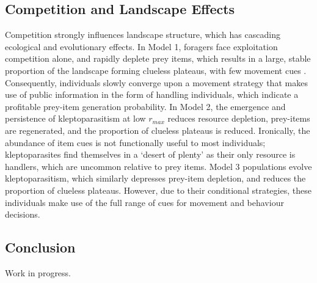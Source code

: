 \documentclass[11pt]{article}
\begin{document}
\subsection{Competition and Landscape Effects}

Competition strongly influences landscape structure, which has cascading ecological and evolutionary effects.
In Model 1, foragers face exploitation competition alone, and rapidly deplete prey items, which results in a large, stable proportion of the landscape forming clueless plateaus, with few movement cues \citep{perkins1992a}.
Consequently, individuals slowly converge upon a movement strategy that makes use of public information in the form of handling individuals, which indicate a profitable prey-item generation probability.
In Model 2, the emergence and persistence of kleptoparasitism at low $r_{max}$ reduces resource depletion, prey-items are regenerated, and the proportion of clueless plateaus is reduced.
Ironically, the abundance of item cues is not functionally useful to most individuals; kleptoparasites find themselves in a `desert of plenty' as their only resource is handlers, which are uncommon relative to prey items.
Model 3 populations evolve kleptoparasitism, which similarly depresses prey-item depletion, and reduces the proportion of clueless plateaus.
However, due to their conditional strategies, these individuals make use of the full range of cues for movement and behaviour decisions.

\subsection{Conclusion}

Work in progress.
\end{document}

